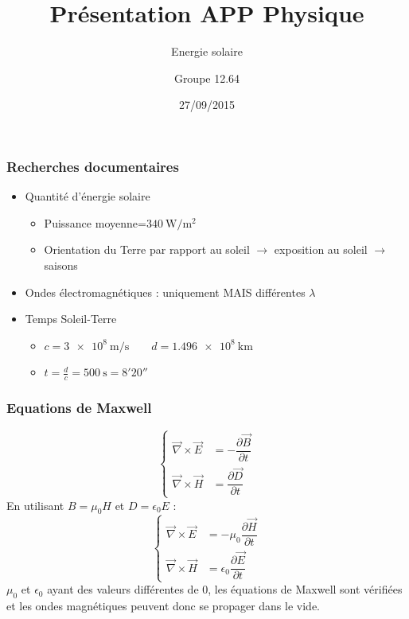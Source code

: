 \documentclass{beamer}
\begin{document}
\title[Présentation]{Présentation APP Physique}

\subtitle[\ldots]{Energie solaire}
\author{Groupe 12.64}
\date{27/09/2015}
\maketitle

\begin{frame}
\frametitle{Recherches documentaires}
\begin{itemize}
\item Quantité d'énergie solaire \begin{itemize}
	\item Puissance moyenne=$\SI{340}{\watt\per\meter^2}$
	\item Orientation du Terre par rapport au soleil $\rightarrow$ exposition au soleil $\rightarrow$ saisons
	\end{itemize}
\item Ondes électromagnétiques : uniquement MAIS différentes $\lambda$
\item Temps Soleil-Terre \begin{itemize}
	\item $c=\SI{3e8}{\meter\per\second} \qquad d=\SI{1.496e8}{\kilo\meter}$
	\item $t=\frac{d}{c}=\SI{500}{\second}=8'20''$
	\end{itemize}
\end{itemize}
\end{frame} 

\begin{frame}
	\frametitle{Equations de Maxwell}
	$$\begin{cases}
			\vec{\nabla} \times \vec{E} &= - \dfrac{\partial{\vec{B}}}{\partial{t}} \\
			\vec{\nabla} \times \vec{H} &= \dfrac{\partial{\vec{D}}}{\partial{t}}
		\end{cases}$$
	En utilisant $B = \mu_0H$ et $D = \epsilon_0E$ :
	$$\begin{cases}
			\vec{\nabla} \times \vec{E} &= - \mu_0\dfrac{\partial{\vec{H}}}{\partial{t}} \\
			\vec{\nabla} \times \vec{H} &= \epsilon_0\dfrac{\partial{\vec{E}}}{\partial{t}}
		\end{cases}$$
		$\mu_0$ et $\epsilon_0$ ayant des valeurs différentes de $0$, les équations de Maxwell sont vérifiées et les ondes magnétiques peuvent donc se propager dans le vide.
\end{frame}
\end{document}
